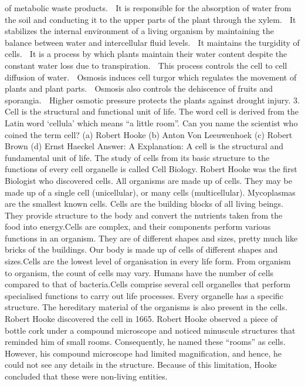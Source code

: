 of metabolic waste products.
 It is responsible for the absorption of water from the soil and
conducting it to the upper parts of the plant through the
xylem.
 It stabilizes the internal environment of a living organism by
maintaining the balance between water and intercellular fluid
levels.
 It maintains the turgidity of cells.
 It is a process by which plants maintain their water content
despite the constant water loss due to transpiration.
 This process controls the cell to cell diffusion of water.
 Osmosis induces cell turgor which regulates the movement of
plants and plant parts.
 Osmosis also controls the dehiscence of fruits and sporangia.
 Higher osmotic pressure protects the plants against drought
injury.
3. Cell is the structural and functional unit of life. The word cell
is derived from the Latin word ‘cellula’ which means “a little
room”. Can you name the scientist who coined the term cell?
(a) Robert Hooke
(b) Anton Von Leeuwenhoek
(c) Robert Brown
(d) Ernst Haeckel
Answer: A
Explanation: A cell is the structural and fundamental unit of life.
The study of cells from its basic structure to the functions of every
cell organelle is called Cell Biology. Robert Hooke was the first
Biologist who discovered cells.
All organisms are made up of cells. They may be made up of a single
cell (unicellular), or many cells (multicellular). Mycoplasmas are the
smallest known cells. Cells are the building blocks of all living beings.
They provide structure to the body and convert the nutrients taken
from the food into energy.Cells are complex, and their components
perform various functions in an organism. They are of different
shapes and sizes, pretty much like bricks of the buildings. Our body
is made up of cells of different shapes and sizes.Cells are the lowest
level of organisation in every life form. From organism to organism,
the count of cells may vary. Humans have the number of cells
compared to that of bacteria.Cells comprise several cell organelles
that perform specialised functions to carry out life processes. Every
organelle has a specific structure. The hereditary material of the
organisms is also present in the cells.
Robert Hooke discovered the cell in 1665. Robert Hooke observed a
piece of bottle cork under a compound microscope and noticed
minuscule structures that reminded him of small rooms.
Consequently, he named these “rooms” as cells. However, his
compound microscope had limited magnification, and hence, he could
not see any details in the structure. Because of this limitation,
Hooke concluded that these were non-living entities.
